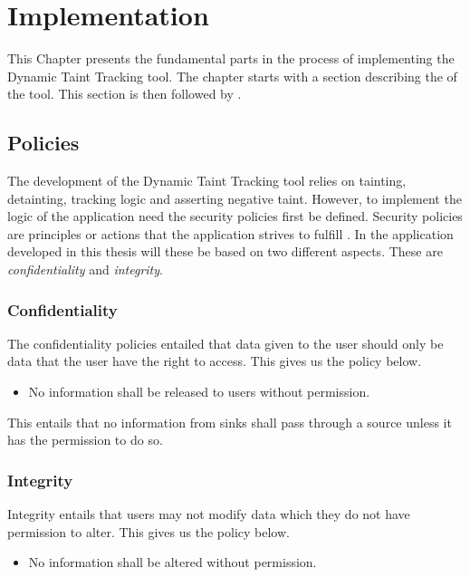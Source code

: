 \chapter{Implementation}
This Chapter presents the fundamental parts in the process of implementing the Dynamic Taint Tracking tool. The chapter starts with a section describing the \textit{} of the tool. This section is then followed by \textit{}.



\section{Policies}
\label{Policies}
The development of the Dynamic Taint Tracking tool relies on tainting, detainting, tracking logic and asserting negative taint. However, to implement the logic of the application need the security policies first be defined. Security policies are principles or actions that the application strives to fulfill \parencite{BayukJenniferL2012Cspg}. In the application developed in this thesis will these be based on two different aspects. These are \textit{confidentiality} and \textit{integrity}.



\subsection{Confidentiality}
The confidentiality policies entailed that data given to the user should only be data that the user have the right to access. This gives us the policy below.

\hfill
\begin{itemize}
    \item No information shall be released to users without permission.
\end{itemize}
\hfill

This entails that no information from sinks shall pass through a source unless it has the permission to do so.



\subsection{Integrity}
Integrity entails that users may not modify data which they do not have permission to alter. This gives us the policy below.

\hfill
\begin{itemize}
    \item No information shall be altered without permission.
\end{itemize}
\hfill

